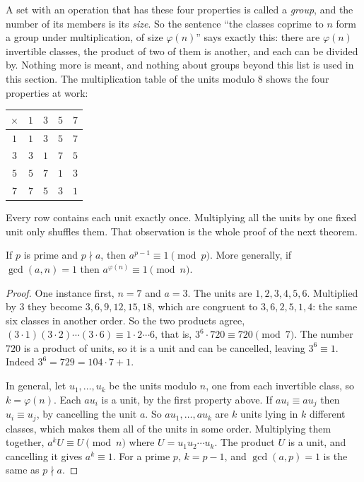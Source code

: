 A set with an operation that has these four properties is called a \emph{group}, and the number of its members is its \emph{size}. So the sentence ``the classes coprime to $n$ form a group under multiplication, of size $\varphi(n)$'' says exactly this: there are $\varphi(n)$ invertible classes, the product of two of them is another, and each can be divided by. Nothing more is meant, and nothing about groups beyond this list is used in this section. The multiplication table of the units modulo $8$ shows the four properties at work:

\begin{center}\small
\begin{tabular}{c|cccc}
$\times$ & $1$ & $3$ & $5$ & $7$ \\
\midrule
$1$ & $1$ & $3$ & $5$ & $7$ \\
$3$ & $3$ & $1$ & $7$ & $5$ \\
$5$ & $5$ & $7$ & $1$ & $3$ \\
$7$ & $7$ & $5$ & $3$ & $1$ \\
\end{tabular}
\end{center}

Every row contains each unit exactly once. Multiplying all the units by one fixed unit only shuffles them. That observation is the whole proof of the next theorem.

\begin{theorem}
If $p$ is prime and $p \nmid a$, then $a^{p-1} \equiv 1 \pmod p$. More generally, if $\gcd(a, n) = 1$ then $a^{\varphi(n)} \equiv 1 \pmod n$.
\end{theorem}

\begin{proof}
One instance first, $n = 7$ and $a = 3$. The units are $1, 2, 3, 4, 5, 6$. Multiplied by $3$ they become $3, 6, 9, 12, 15, 18$, which are congruent to $3, 6, 2, 5, 1, 4$: the same six classes in another order. So the two products agree, $(3 \cdot 1)(3 \cdot 2) \cdots (3 \cdot 6) \equiv 1 \cdot 2 \cdots 6$, that is, $3^6 \cdot 720 \equiv 720 \pmod 7$. The number $720$ is a product of units, so it is a unit and can be cancelled, leaving $3^6 \equiv 1$. Indeed $3^6 = 729 = 104 \cdot 7 + 1$.

In general, let $u_1, \dots, u_k$ be the units modulo $n$, one from each invertible class, so $k = \varphi(n)$. Each $a u_i$ is a unit, by the first property above. If $a u_i \equiv a u_j$ then $u_i \equiv u_j$, by cancelling the unit $a$. So $a u_1, \dots, a u_k$ are $k$ units lying in $k$ different classes, which makes them all of the units in some order. Multiplying them together, $a^k U \equiv U \pmod n$ where $U = u_1 u_2 \cdots u_k$. The product $U$ is a unit, and cancelling it gives $a^k \equiv 1$. For a prime $p$, $k = p - 1$, and $\gcd(a, p) = 1$ is the same as $p \nmid a$.
\end{proof}

